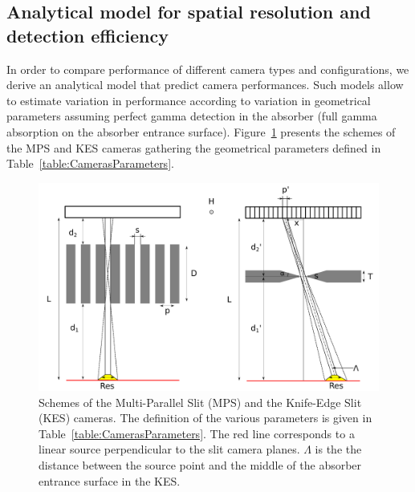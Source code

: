 \documentclass[a4paper,english,12pt]{article}
\begin{document}
\subsection{Analytical model for spatial resolution and detection efficiency}


In order to compare performance of different camera types and configurations, we derive an analytical model that predict camera performances. Such models allow to estimate variation in performance according to variation in geometrical parameters assuming perfect gamma detection in the absorber (full gamma absorption on the absorber entrance surface). Figure~\ref{fig:CamerasParameters} presents the schemes of the MPS and KES cameras gathering the geometrical parameters defined in Table~\ref{table:CamerasParameters}.

\begin{figure}[htbp]
    \centering
    \includegraphics[width=.8\textwidth]{MPS-KES_scheme}
    \caption{Schemes of the Multi-Parallel Slit (MPS) and the Knife-Edge Slit (KES) cameras. The definition of the various parameters is given in Table~\ref{table:CamerasParameters}. The red line corresponds to a linear source perpendicular to the slit camera planes. $\Lambda$ is the the distance between the source point and the middle of the absorber entrance surface in the KES.}
    \label{fig:CamerasParameters}
\end{figure}    
\end{document}
